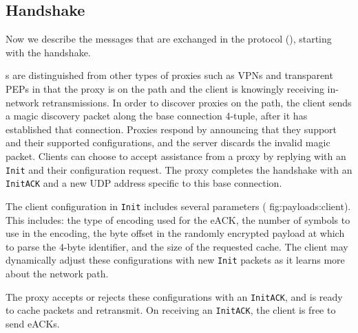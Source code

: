 


\subsection{Handshake}



Now we describe the messages that are exchanged in the
\Sys protocol (), starting with the handshake.

\Sys\!s are distinguished from other types of proxies such as VPNs and
transparent PEPs in that the proxy is on the path and the client is knowingly
receiving in-network retransmissions. In order to discover \Sys proxies on the
path, the client sends a magic discovery packet along the base connection
4-tuple, after it has established that connection. Proxies respond by
announcing that they support \Sys and their supported configurations, and the
server discards the invalid magic packet. Clients can choose to accept
assistance from a proxy by replying with an \texttt{Init} and their
configuration request. The proxy completes the handshake with an \texttt
{InitACK} and a new UDP address specific to this base connection.

The client configuration in \texttt{Init} includes several parameters (\Cref
{fig:payloads:client}). This includes: the type of encoding used for the eACK,
the number of symbols to use in the encoding, the byte offset in the randomly
encrypted payload at which to parse the 4-byte identifier, and the size of the
requested cache. The client may dynamically adjust these configurations with
new \texttt{Init} packets as it learns more about the network path.

The proxy accepts or rejects these configurations with an \texttt{InitACK}, and
is ready to cache packets and retransmit. On receiving an \texttt{InitACK}, the
client is free to send eACKs.

